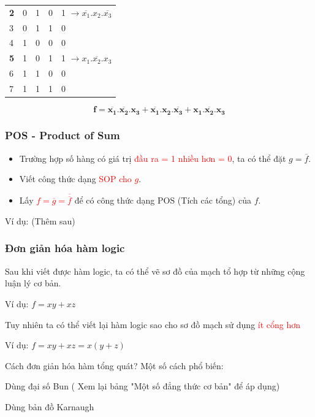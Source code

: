 \documentclass[12pt]{article}
\newcommand{\SubItem}[1]{
    {\setlength\itemindent{15pt} \item[-] #1}
}
\begin{document}
\begin{sloppypar}
\begin{table}[H]
\begin{tabular}{llll|l}
    \textbf{2}                  & 0                      & 1  & 0  & {\color[HTML]{FE0000} 1}   \(\rightarrow \overline{x_{1}}. x_{2}.\overline{x_{3}}\)                        \\
    3                           & 0                      & 1  & 1  & 0                          \\
    4                           & 1                      & 0  & 0  & 0                          \\
    \textbf{5}                  & 1                      & 0  & 1  & {\color[HTML]{FE0000} 1}   \(\rightarrow x_{1}.\overline{x_{2}}.x_{3}\)                                    \\
    6                           & 1                      & 1  & 0  & 0                          \\
    7                           & 1                      & 1  & 1  & 0                       
    \end{tabular}
    \end{table}
\[\boldsymbol{f = \overline{x_{1}}.\overline{x_{2}}.x_{3} + \overline{x_{1}}. x_{2}.\overline{x_{3}} + x_{1}.\overline{x_{2}}.x_{3} }\]

\subsubsection{POS - Product of Sum}
\begin{itemize}
    \item Trường hợp số hàng có giá trị \textcolor{red}{đầu ra = 1 nhiều hơn = 0}, ta có thể đặt \(g = \overline{f}\).
    \item Viết công thức dạng \textcolor{red}{SOP cho \(g\)}.
    \item Lấy \textcolor{red}{\(f = \overline{g} = \overline{\overline{f}}\)} để có công thức dạng POS (Tích các tổng) của \(f\).
\end{itemize}
Ví dụ: (Thêm sau)
\subsubsection{Đơn giản hóa hàm logic}
\begin{itemize}
    \item Sau khi viết được hàm logic, ta có thể vẽ sơ đồ của mạch tổ hợp từ những cộng luận lý cơ bản.
        \SubItem {Ví dụ: \(f = xy + xz \)} 
    \item Tuy nhiên ta có thể viết lại hàm logic sao cho sơ đồ mạch sử dụng \textcolor{red}{ít cổng hơn}
        \SubItem {Ví dụ: \(f = xy + xz = x(y + z)\)}
    \item Cách đơn giản hóa hàm tổng quát? Một số cách phổ biến:
        \SubItem{Dùng đại số Bun ( Xem lại bảng "Một số đẳng thức cơ bản" để áp dụng)}
        \SubItem{Dùng bản đồ Karnaugh} 
\end{itemize}    


\end{sloppypar}
\end{document}
